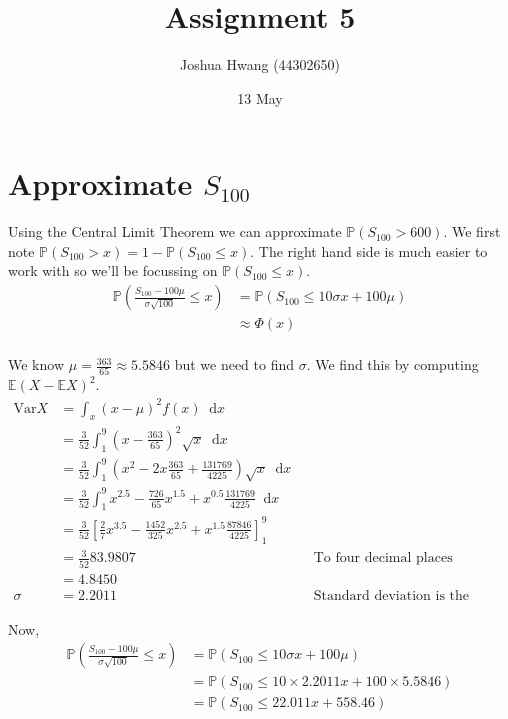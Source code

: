 \documentclass{article}
\title{Assignment 5}
\author{Joshua Hwang (44302650)}
\date{13 May}
\newcommand{\diff}{\mathop{}\!\mathrm{d}}
\newcommand{\prob}{\mathbb{P}}
\newcommand{\expect}{\mathbb{E}}
\begin{document}
\maketitle

\section{Approximate $S_{100}$}
Using the Central Limit Theorem we can approximate $\prob(S_{100} > 600)$.
We first note $\prob(S_{100} > x) = 1 - \prob(S_{100} \leq x)$. The right
hand side is much easier to work with so we'll be focussing on
$\prob(S_{100} \leq x)$.
\begin{align*}
    \prob \left( \frac{S_{100} - 100\mu}{\sigma \sqrt{100}} \leq x \right)
    &= \prob \left( S_{100} \leq 10 \sigma x + 100\mu \right) \\
    &\approx \Phi(x) \\
\end{align*}

We know $\mu = \frac{363}{65} \approx 5.5846$ but we need to find $\sigma$.
We find this by computing $\expect (X - \expect X)^2$.
\begin{align*}
    \text{Var} X &= \int_x (x - \mu)^2 f(x) \diff x \\
    &= \frac{3}{52} \int_1^9 (x - \frac{363}{65})^2 \sqrt{x} \diff x \\
    &= \frac{3}{52} \int_1^9
    \left( x^2 - 2x\frac{363}{65} + \frac{131769}{4225} \right)
    \sqrt{x} \diff x \\
    &= \frac{3}{52} \int_1^9
    x^{2.5} - \frac{726}{65}x^{1.5} + x^{0.5}\frac{131769}{4225} \diff x \\
    &= \frac{3}{52} \left[
    \frac{2}{7}x^{3.5} - \frac{1452}{325}x^{2.5} + x^{1.5}\frac{87846}{4225}
    \right]_1^9 \\
    &= \frac{3}{52} 83.9807 && \text{To four decimal places} \\
    &= 4.8450 \\
    \sigma &= 2.2011
    && \text{Standard deviation is the square root of Variance}
\end{align*}

Now,
\begin{align*}
    \prob \left( \frac{S_{100} - 100\mu}{\sigma \sqrt{100}} \leq x \right)
    &= \prob \left( S_{100} \leq 10 \sigma x + 100\mu \right) \\
    &= \prob \left( S_{100} \leq 10 \times 2.2011 x + 100 \times 5.5846 \right) \\
    &= \prob \left( S_{100} \leq 22.011 x + 558.46 \right)
\end{align*}
\end{document}
